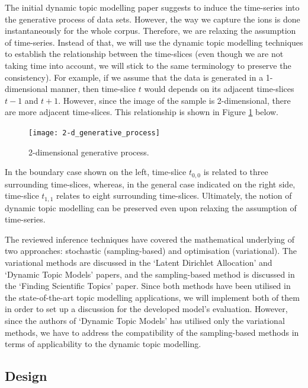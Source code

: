 \documentclass{mprop}
\begin{document}
The initial dynamic topic modelling paper suggests to induce the time-series into the generative process of data sets. However, the way we capture the ions is done instantaneously for the whole corpus. Therefore, we are relaxing the assumption of time-series. Instead of that, we will use the dynamic topic modelling techniques to establish the relationship between the time-slices (even though we are not taking time into account, we will stick to the same terminology to preserve the consistency). For example, if we assume that the data is generated in a 1-dimensional manner, then time-slice $t$ would depends on its adjacent time-slices $t-1$ and $t+1$. However, since the image of the sample is 2-dimensional, there are more adjacent time-slices. This relationship is shown in Figure \ref{fig:2-d_generative_process} below.
\begin{figure}[H]
  \centering
  \texttt{[image: 2-d\_generative\_process]}
  \caption{2-dimensional generative process.}
  \label{fig:2-d_generative_process}
\end{figure}
In the boundary case shown on the left, time-slice $t_{0,0}$ is related to three surrounding time-slices, whereas, in the general case indicated on the right side, time-slice $t_{1,1}$ relates to eight surrounding time-slices. Ultimately, the notion of dynamic topic modelling can be  preserved even upon relaxing the assumption of time-series.

\par The reviewed inference techniques have covered the mathematical underlying of two approaches: stochastic (sampling-based) and optimisation (variational). The variational methods are discussed in the `Latent Dirichlet Allocation' and `Dynamic Topic Models' papers, and the sampling-based method is discussed in the `Finding Scientific Topics' paper. Since both methods have been utilised in the state-of-the-art topic modelling applications, we will implement both of them in order to set up a discussion for the developed model's evaluation. However, since the authors of `Dynamic Topic Models' has utilised only the variational methods, we have to address the compatibility of the sampling-based methods in terms of applicability to the dynamic topic modelling.


\subsection{Design}
\end{document}

